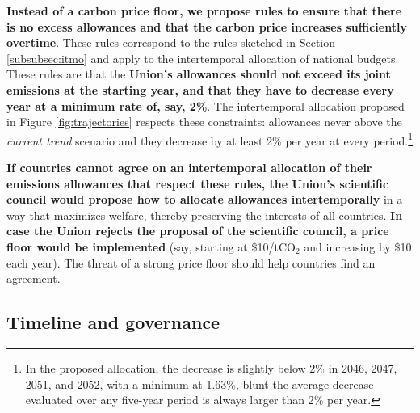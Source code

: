 \documentclass[12pt,english]{article}
\begin{document}
\textbf{Instead of a carbon price floor, we propose rules to ensure that there is no excess allowances and that the carbon price increases sufficiently overtime}. These rules correspond to the rules sketched in Section \ref{subsubsec:itmo} and apply to the intertemporal allocation of national budgets. These rules are that the \textbf{Union's allowances should not exceed its joint emissions at the starting year, and that they have to decrease every year at a minimum rate of, say, 2\%}. The intertemporal allocation proposed in Figure \ref{fig:trajectories} respects these constraints: allowances never above the \textit{current trend} scenario and they decrease by at least 2\% per year at every period.\footnote{In the proposed allocation, the decrease is slightly below 2\% in 2046, 2047, 2051, and 2052, with a minimum at 1.63\%, blunt the average decrease evaluated over any five-year period is always larger than 2\% per year.}

\textbf{If countries cannot agree on an intertemporal allocation of their emissions allowances that respect these rules, the Union's scientific council would propose how to allocate allowances intertemporally} in a way that maximizes welfare, thereby preserving the interests of all countries. \textbf{In case the Union rejects the proposal of the scientific council, a price floor would be implemented} (say, starting at \$10/tCO$_\text{2}$ and increasing by \$10 each year). The threat of a strong price floor should help countries find an agreement.

\subsection{Timeline and governance\label{subsec:implementation}}

\end{document}
